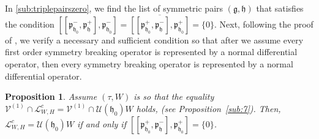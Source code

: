 \documentclass[12pt]{amsart}
\newtheorem{prop}[thm]{Proposition}
\theoremstyle{definition}
\theoremstyle{remark}
\newcommand{\g}{\mathfrak{g}}
\newcommand{\h}{\mathfrak{h}}
\newcommand{\p}{\mathfrak p}
\numberwithin{equation}{section}
\begin{document}
 In \ref{sub:triplepairszero},  we find the list of symmetric   pairs $(\g,\h)$ that satisfies the condition $[[ \p_{\h_0}^-,\p_\h^+ ],\p_{\h_0}^-]=\overline{[[ \p_{\h_0}^+, \p_\h^- ],
\p_{\h_0}^+]}=\{0\}$.  Next, following the proof of \cite[Proposition 3]{Va}, we verify a necessary and sufficient condition so that after we assume every first order symmetry breaking operator is represented by a normal differential operator, then every symmetry breaking operator is represented by a normal differential operator.
\begin{prop}\label{prop:equal} Assume $(\tau, W)$ is so that the equality $  \mathcal V^{(1)}\cap \mathcal L_{W,H}^c  =
\mathcal V^{(1)}\cap \mathcal U(\h_0)W    $ holds, (see
Proposition~\ref{sub:7}).
  Then, \\
\phantom{xxxxxxxxx}   $\mathcal L_{W,H}^c =\mathcal U(\h_0)W $ if and only if
$[[ \p_{\h_0}^+,\p_\h^- ],\p_{\h_0}^+]=\{0\}$.
\end{prop}
\end{document}

